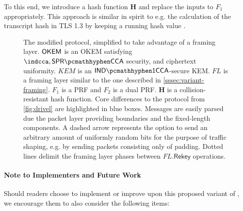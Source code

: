 To this end, we introduce a hash function $\mathbf{H}$ and replace the inputs to $F_1$ appropriately. This approach is similar in spirit to e.g. the calculation of the transcript hash in TLS 1.3 by keeping a running hash value \cite[Section~4.4.1]{rfc8446}.

\begin{figure}
    
    \caption[
        The modified \drivel{} protocol, simplified to take advantage of a framing layer.
    ]{
        The modified \drivel{} protocol, simplified to take advantage of a framing layer.
        $\mathsf{OKEM}$ is an OKEM satisfying $\indcca, \sprcca$ security, and ciphertext uniformity.
        $KEM$ is an $\indonecca$-secure KEM.
        $FL$ is a framing layer similar to the one described in \cref{sssec:variant-framing}.
        $F_1$ is a PRF and $F_2$ is a dual PRF.
        $\mathbf{H}$ is a collision-resistant hash function.
        Core differences to the \drivel{} protocol from \cref{fig:drivel} are highlighted in blue boxes.
        Messages are easily parsed due the packet layer providing boundaries and the fixed-length components.
        A dashed arrow represents the option to send an arbitrary amount of uniformly random bits for the purpose of traffic shaping, e.g. by sending packets consisting only of padding.
        Dotted lines delimit the framing layer phases between $FL.\mathsf{Rekey}$ operations.
    }
    \label{fig:modified-drivel-framing}
\end{figure}

\paragraph{Note to Implementers and Future Work}

Should readers choose to implement or improve upon this proposed variant of \drivel{}, we encourage them to also consider the following items:

